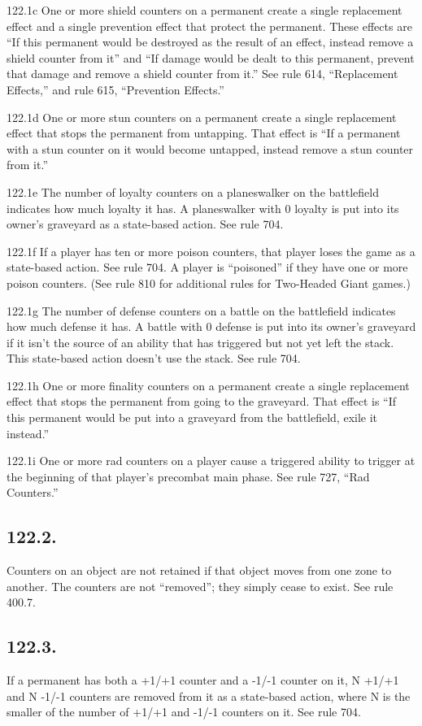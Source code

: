 122.1c One or more shield counters on a permanent create a single replacement effect and a single prevention effect that protect the permanent. These effects are “If this permanent would be destroyed as the result of an effect, instead remove a shield counter from it” and “If damage would be dealt to this permanent, prevent that damage and remove a shield counter from it.” See rule 614, “Replacement Effects,” and rule 615, “Prevention Effects.”

122.1d One or more stun counters on a permanent create a single replacement effect that stops the permanent from untapping. That effect is “If a permanent with a stun counter on it would become untapped, instead remove a stun counter from it.”

122.1e The number of loyalty counters on a planeswalker on the battlefield indicates how much loyalty it has. A planeswalker with 0 loyalty is put into its owner’s graveyard as a state-based action. See rule 704.

122.1f If a player has ten or more poison counters, that player loses the game as a state-based action. See rule 704. A player is “poisoned” if they have one or more poison counters. (See rule 810 for additional rules for Two-Headed Giant games.)

122.1g The number of defense counters on a battle on the battlefield indicates how much defense it has. A battle with 0 defense is put into its owner’s graveyard if it isn’t the source of an ability that has triggered but not yet left the stack. This state-based action doesn’t use the stack. See rule 704.

122.1h One or more finality counters on a permanent create a single replacement effect that stops the permanent from going to the graveyard. That effect is “If this permanent would be put into a graveyard from the battlefield, exile it instead.”

122.1i One or more rad counters on a player cause a triggered ability to trigger at the beginning of that player’s precombat main phase. See rule 727, “Rad Counters.”

\subsection*{122.2.}
Counters on an object are not retained if that object moves from one zone to another. The counters are not “removed”; they simply cease to exist. See rule 400.7.

\subsection*{122.3.}
If a permanent has both a +1/+1 counter and a -1/-1 counter on it, N +1/+1 and N -1/-1 counters are removed from it as a state-based action, where N is the smaller of the number of +1/+1 and -1/-1 counters on it. See rule 704.


